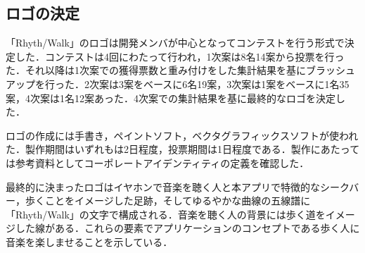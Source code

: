 \subsection{ロゴの決定}
\par 「Rhyth/Walk」のロゴは開発メンバが中心となってコンテストを行う形式で決定した．コンテストは4回にわたって行われ，1次案は8名14案から投票を行った．それ以降は1次案での獲得票数と重み付けをした集計結果を基にブラッシュアップを行った．2次案は3案をベースに6名19案，3次案は1案をベースに1名35案，4次案は1名12案あった．4次案での集計結果を基に最終的なロゴを決定した．
\par ロゴの作成には手書き，ペイントソフト，ベクタグラフィックスソフトが使われた．製作期間はいずれもは2日程度，投票期間は1日程度である．製作にあたっては参考資料としてコーポレートアイデンティティの定義を確認した．
\par 最終的に決まったロゴはイヤホンで音楽を聴く人と本アプリで特徴的なシークバー，歩くことをイメージした足跡，そしてゆるやかな曲線の五線譜に「Rhyth/Walk」の文字で構成される．音楽を聴く人の背景には歩く道をイメージした線がある．これらの要素でアプリケーションのコンセプトである歩く人に音楽を楽しませることを示している．
